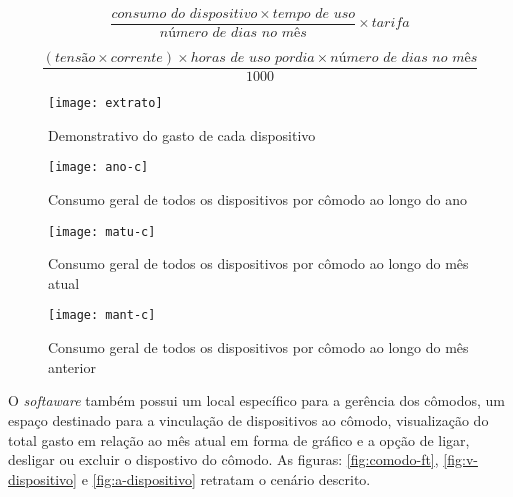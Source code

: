 \begin{equation} \label{eq-consumo}
	\frac{consumo \, \, do \, \, dispositivo \times tempo \, \, de \, \, uso}{número \, \, de \, \, dias \, \, no \, \, mês} \times tarifa
\end{equation}

\begin{equation} \label{eq-potencia}
	 \frac{ (tensão \times corrente) \times horas \, \, de \, \, uso \, \, por dia \times número \, \, de \, \, dias \, \, no \, \, mês}{1000}
\end{equation} 

\begin{figure}[h!]
	\texttt{[image: extrato]}
	\centering
	\caption[Demonstrativo do gasto de cada dispositivo]{Demonstrativo do gasto de cada dispositivo}
	\label{fig:extrato} 
\end{figure}
\FloatBarrier

\begin{figure}[h!]
	\texttt{[image: ano-c]}
	\centering
	\caption[Consumo geral de todos os dispositivos por cômodo ao longo do ano]{Consumo geral de todos os dispositivos por cômodo ao longo do ano}
	\label{fig:ano-c} 
\end{figure}
\FloatBarrier

\begin{figure}[h!]
	\texttt{[image: matu-c]}
	\centering
	\caption[Consumo geral de todos os dispositivos por cômodo ao longo do mês atual]{Consumo geral de todos os dispositivos por cômodo ao longo do mês atual}
	\label{fig:matu-c} 
\end{figure}
\FloatBarrier

\begin{figure}[h!]
	\texttt{[image: mant-c]}
	\centering
	\caption[Consumo geral de todos os dispositivos por cômodo ao longo do mês anterior]{Consumo geral de todos os dispositivos por cômodo ao longo do mês anterior}
	\label{fig:mant-c} 
\end{figure}
\FloatBarrier

O \textit{softaware} também possui um local específico para a gerência dos cômodos, um espaço destinado para a vinculação de dispositivos ao cômodo,
visualização do total gasto em relação ao mês atual em forma de gráfico e a opção de ligar, desligar ou excluir o dispostivo do cômodo. As figuras:
\ref{fig:comodo-ft}, \ref{fig:v-dispositivo} e \ref{fig:a-dispositivo} retratam o cenário descrito.

